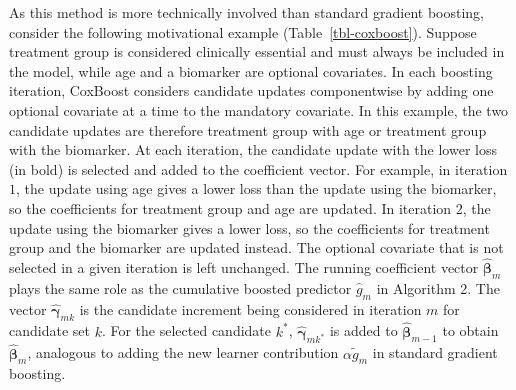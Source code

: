 \documentclass[
  letterpaper,
  krantz2]{style/krantz}
\begin{document}
As this method is more technically involved than standard gradient
boosting, consider the following motivational example
(Table~\ref{tbl-coxboost}). Suppose treatment group is considered
clinically essential and must always be included in the model, while age
and a biomarker are optional covariates. In each boosting iteration,
CoxBoost considers candidate updates componentwise by adding one
optional covariate at a time to the mandatory covariate. In this
example, the two candidate updates are therefore treatment group with
age or treatment group with the biomarker. At each iteration, the
candidate update with the lower loss (in bold) is selected and added to
the coefficient vector. For example, in iteration \(1\), the update
using age gives a lower loss than the update using the biomarker, so the
coefficients for treatment group and age are updated. In iteration
\(2\), the update using the biomarker gives a lower loss, so the
coefficients for treatment group and the biomarker are updated instead.
The optional covariate that is not selected in a given iteration is left
unchanged. The running coefficient vector \(\hat{\boldsymbol{\beta}}_m\)
plays the same role as the cumulative boosted predictor \(\hat{g}_m\) in
Algorithm 2. The vector \(\hat{\boldsymbol{\gamma}}_{mk}\) is the
candidate increment being considered in iteration \(m\) for candidate
set \(k\). For the selected candidate \(k^*\),
\(\hat{\boldsymbol{\gamma}}_{mk^*}\) is added to
\(\hat{\boldsymbol{\beta}}_{m-1}\) to obtain
\(\hat{\boldsymbol{\beta}}_m\), analogous to adding the new learner
contribution \(\alpha \tilde{g}_m\) in standard gradient boosting.
\end{document}
